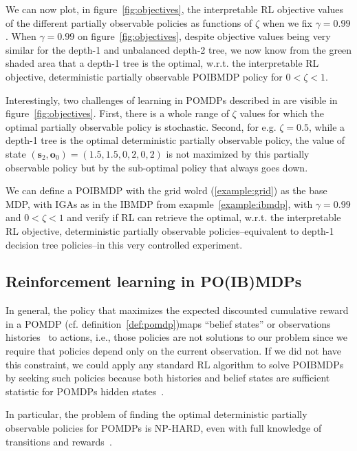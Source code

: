We can now plot, in figure~\ref{fig:objectives}, the interpretable RL objective values of the different partially observable policies as functions of $\zeta$ when we fix $\gamma=0.99$. 
When $\gamma=0.99$ on figure~\ref{fig:objectives}, despite objective values being very similar for the depth-1 and unbalanced depth-2 tree, we now know from the green shaded area that a depth-1 tree is the optimal, w.r.t. the interpretable RL objective, deterministic partially observable POIBMDP policy for $0< \zeta < 1$.

Interestingly, two challenges of learning in POMDPs described in \cite{learning-pomdp} are visible in figure~\ref{fig:objectives}. 
First, there is a whole range of $\zeta$ values for which the optimal partially observable policy is stochastic.
Second, for e.g. $\zeta=0.5$, while a depth-1 tree is the optimal deterministic partially observable policy, the value of state $(\boldsymbol{s}_2, \boldsymbol{o}_0) = (1.5, 1.5, 0, 2, 0, 2)$ is not maximized by this partially observable policy but by the sub-optimal policy that always goes down.

We can define a POIBMDP with the grid wolrd (\ref{example:grid}) as the base MDP, with IGAs as in the IBMDP from exapmle~\ref{example:ibmdp}, with $\gamma=0.99$ and $0<\zeta<1$ and verify if RL can retrieve the optimal, w.r.t. the interpretable RL objective, deterministic partially observable policies--equivalent to depth-1 decision tree policies--in this very controlled experiment.

\subsection{Reinforcement learning in PO(IB)MDPs}

In general, the policy that maximizes the expected discounted cumulative reward in a POMDP (cf. definition~\ref{def:pomdp})maps ``belief states'' or observations histories~\cite{chap2} to actions, i.e., those policies are not solutions to our problem since we require that policies depend only on the current observation.
If we did not have this constraint, we could apply any standard RL algorithm to solve POIBMDPs by seeking such policies because both histories and belief states are sufficient statistic for POMDPs hidden states~\cite{chap2,lambrechts2025informed}.

In particular, the problem of finding the optimal deterministic partially observable policies for POMDPs is NP-HARD, even with full knowledge of transitions and rewards~\cite[section 3.2]{littman1}. 

